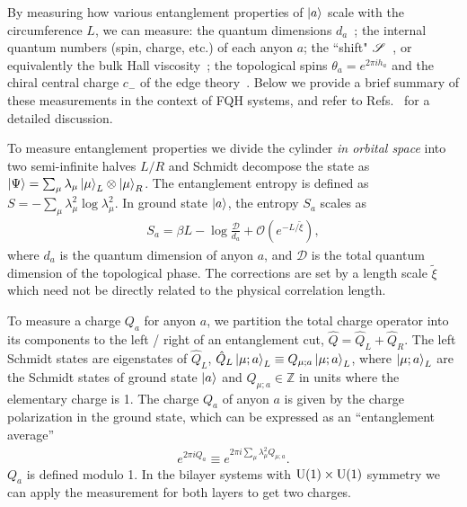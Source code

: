 By measuring how various entanglement properties of $\ket{a}$ scale with the circumference $L$, we can measure:
	the quantum dimensions $d_a$~\cite{KitaevPreskill,LevinWen};
	the internal quantum numbers (spin, charge, etc.) of each anyon $a$;
	the ``shift" $\mathscr{S}$~\cite{wenzee}, or equivalently the bulk Hall viscosity~\cite{ZaletelQHdmrg13};
	the topological spins $\theta_a = e^{2 \pi i h_a}$ and the chiral central charge $c_-$ of the edge theory~\cite{Zhang2012, ZaletelQHdmrg13, HHTuMomPol13}.
Below we provide a brief summary of these measurements in the context of FQH systems, and refer to Refs.~\cite{ZaletelMixing} for a detailed discussion. 

To measure entanglement properties we divide the cylinder \emph{in orbital space} into two semi-infinite halves $L/R$ and Schmidt decompose the state as $ \ket{\Psi} = \sum_\mu \lambda_\mu \ket{\mu}_{ L} \otimes \ket{\mu}_{ R}$.
The entanglement entropy is defined as $S= - \sum_\mu \lambda_\mu^2 \log \lambda_\mu^2$.
In ground state $\ket{a}$, the entropy $S_a$ scales as \cite{KitaevPreskill,LevinWen} 
\begin{align}
	S_a = \beta L - \log\frac{\mathcal{D}}{d_a} + \mathcal{O}(e^{-L / \tilde{\xi}}),
	\label{eq:TEE}
\end{align}
where $d_a$ is the quantum dimension of anyon $a$, and $\mathcal{D}$ is the total quantum dimension of the topological phase.
The corrections are set by a length scale $\tilde{\xi}$ which need not be directly related to the physical correlation length.

To measure a \Uone charge $Q_a$ for anyon $a$, we partition the total charge operator into its components to the left / right of an entanglement cut, $\hat{Q} = \hat{Q}_L + \hat{Q}_R$. 
The left Schmidt states are eigenstates of $\hat{Q}_L$, $\hat{Q}_L \ket{\mu; a}_L \equiv Q_{\mu; a} \ket{\mu; a}_L $, where $\ket{\mu; a}_L$ are the Schmidt states of ground state $\ket{a}$ and $Q_{\mu; a} \in \mathbb{Z}$ in units where the elementary charge is 1.
The charge $Q_a$ of anyon $a$ is given by the charge polarization in the ground state, which can be expressed as an ``entanglement average'' \cite{ZaletelQHdmrg13}
\begin{align}
	e^{2 \pi i Q_a} \equiv e^{2 \pi i \sum_\mu \lambda^2_\mu Q_{\mu; a}}.
\end{align}
$Q_a$ is defined modulo 1.
In the bilayer systems with $\mathrm{U(1)}\times\mathrm{U(1)}$ symmetry we can apply the measurement for both layers to get two charges.

